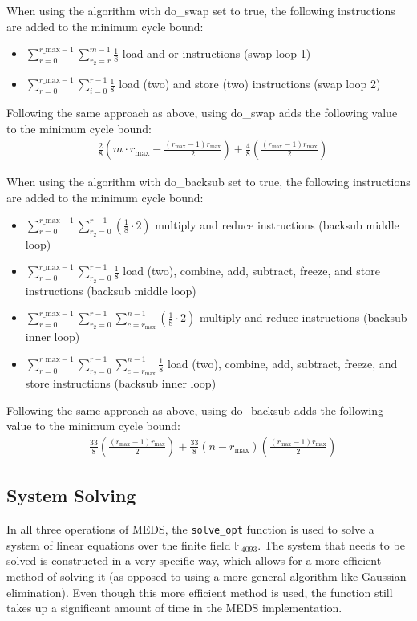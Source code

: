\documentclass[11pt,a4paper]{report}
\theoremstyle{definition}
\begin{document}
When using the algorithm with do\_swap set to true, the following instructions are added to the minimum cycle bound:
\begin{itemize}
  \item $\sum_{r=0}^{r\_\text{max}-1} \sum_{r_2=r}^{m-1} \frac{1}{8}$ load and or instructions (swap loop 1)
  \item $\sum_{r=0}^{r\_\text{max}-1} \sum_{i=0}^{r-1} \frac{1}{8}$ load (two) and store (two) instructions (swap loop 2)
\end{itemize}
Following the same approach as above, using do\_swap adds the following value to the minimum cycle bound:
\begin{align*}
  & \frac{2}{8} \left( m \cdot r_\text{max} - \frac{(r_\text{max} - 1)r_{\text{max}}}{2} \right) + \frac{4}{8} \left( \frac{(r_\text{max} - 1)r_{\text{max}}}{2} \right)
\end{align*}

When using the algorithm with do\_backsub set to true, the following instructions are added to the minimum cycle bound:
\begin{itemize}
  \item $\sum_{r=0}^{r\_\text{max}-1} \sum_{r_2=0}^{r-1} (\frac{1}{8} \cdot 2)$ multiply and reduce instructions (backsub middle loop)
  \item $\sum_{r=0}^{r\_\text{max}-1} \sum_{r_2=0}^{r-1} \frac{1}{8}$ load (two), combine, add, subtract, freeze, and store instructions (backsub middle loop)
  \item $\sum_{r=0}^{r\_\text{max}-1} \sum_{r_2=0}^{r-1} \sum_{c=r_\text{max}}^{n-1} (\frac{1}{8} \cdot 2)$ multiply and reduce instructions (backsub inner loop)
  \item $\sum_{r=0}^{r\_\text{max}-1} \sum_{r_2=0}^{r-1} \sum_{c=r_\text{max}}^{n-1} \frac{1}{8}$ load (two), combine, add, subtract, freeze, and store instructions (backsub inner loop)
\end{itemize}
Following the same approach as above, using do\_backsub adds the following value to the minimum cycle bound:
\begin{align*}
  & \frac{33}{8} \left( \frac{(r_\text{max} - 1)r_{\text{max}}}{2} \right) + \frac{33}{8} \left( n - r_\text{max} \right) \left( \frac{(r_\text{max} - 1)r_{\text{max}}}{2} \right)
\end{align*}

\subsection{System Solving}
\label{sec:systemsolving}
In all three operations of MEDS, the \texttt{solve\_opt} function is used to solve a system of linear equations over the finite field $\mathbb{F}_{4093}$. The system that needs to be solved is constructed in a very specific way, which allows for a more efficient method of solving it (as opposed to using a more general algorithm like Gaussian elimination). Even though this more efficient method is used, the function still takes up a significant amount of time in the MEDS implementation.
\end{document}
